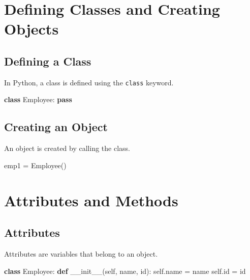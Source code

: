 \documentclass[
  letterpaper,
  DIV=11,
  numbers=noendperiod]{scrreprt}
\newenvironment{Shaded}{\begin{snugshade}}{\end{snugshade}}
\newcommand{\BuiltInTok}[1]{\textcolor[rgb]{0.00,0.23,0.31}{#1}}
\newcommand{\ControlFlowTok}[1]{\textcolor[rgb]{0.00,0.23,0.31}{\textbf{#1}}}
\newcommand{\FunctionTok}[1]{\textcolor[rgb]{0.28,0.35,0.67}{#1}}
\newcommand{\KeywordTok}[1]{\textcolor[rgb]{0.00,0.23,0.31}{\textbf{#1}}}
\newcommand{\NormalTok}[1]{\textcolor[rgb]{0.00,0.23,0.31}{#1}}
\newcommand{\OperatorTok}[1]{\textcolor[rgb]{0.37,0.37,0.37}{#1}}
\newcommand{\VariableTok}[1]{\textcolor[rgb]{0.07,0.07,0.07}{#1}}
\begin{document}
\section{Defining Classes and Creating
Objects}\label{defining-classes-and-creating-objects}

\subsection{Defining a Class}\label{defining-a-class}

In Python, a class is defined using the \texttt{class} keyword.

\begin{Shaded}
\begin{Highlighting}[]
\KeywordTok{class}\NormalTok{ Employee:}
    \ControlFlowTok{pass}
\end{Highlighting}
\end{Shaded}

\subsection{Creating an Object}\label{creating-an-object}

An object is created by calling the class.

\begin{Shaded}
\begin{Highlighting}[]
\NormalTok{emp1 }\OperatorTok{=}\NormalTok{ Employee()}
\end{Highlighting}
\end{Shaded}

\section{Attributes and Methods}\label{attributes-and-methods-1}

\subsection{Attributes}\label{attributes}

Attributes are variables that belong to an object.

\begin{Shaded}
\begin{Highlighting}[]
\KeywordTok{class}\NormalTok{ Employee:}
    \KeywordTok{def} \FunctionTok{\_\_init\_\_}\NormalTok{(}\VariableTok{self}\NormalTok{, name, }\BuiltInTok{id}\NormalTok{):}
        \VariableTok{self}\NormalTok{.name }\OperatorTok{=}\NormalTok{ name}
        \VariableTok{self}\NormalTok{.}\BuiltInTok{id} \OperatorTok{=} \BuiltInTok{id}
\end{Highlighting}
\end{Shaded}
\end{document}
